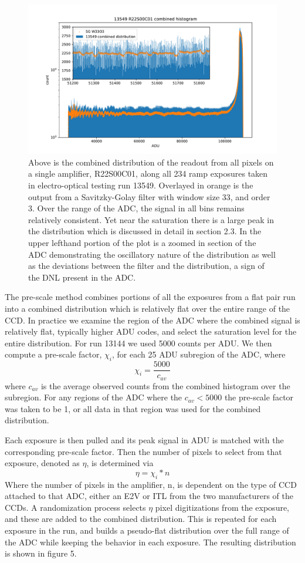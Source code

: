 \documentclass[11pt, letterpaper]{article}
\begin{document}
\begin{figure}
    \centering
    \includegraphics[width=0.5\linewidth]{bar13549.pdf}
    \caption{Above is the combined distribution of the readout from all pixels on a single amplifier, R22S00C01, along all 234 ramp exposures taken in electro-optical testing run 13549. Overlayed in orange is the output from a Savitzky-Golay filter with window size 33, and order 3. Over the range of the ADC, the signal in all bins remains relatively consistent. Yet near the saturation there is a large peak in the distribution which is discussed in detail in section 2.3. In the upper lefthand portion of the plot is a zoomed in section of the ADC demonstrating the oscillatory nature of the distribution as well as the deviations between the filter and the distribution, a sign of the DNL present in the ADC.}
\end{figure}


The pre-scale method combines portions of all the exposures from a flat pair run into a combined distribution which is relatively flat over the entire range of the CCD. 
In practice we examine the region of the ADC where the combined signal is relatively flat, typically higher ADU codes, and select the saturation level for the entire distribution. 
For run 13144 we used 5000 counts per ADU. 
 We then compute a pre-scale factor, $\chi _i$, for each 25 ADU subregion of the ADC, where
\begin{equation}
\chi_i = \frac{5000}{c_{av}}
\end{equation}
where $c_{av}$ is the average observed counts from the combined histogram over the subregion. 
For any regions of the ADC where the $c_{av} < 5000$ the pre-scale factor was taken to be 1, or all data in that region was used for the combined distribution. 
\indent 


Each exposure is then pulled and its peak signal in ADU is matched with the corresponding pre-scale factor. 
Then the number of pixels to select from that exposure, denoted as $\eta $, is determined via
 \begin{equation}
 \eta = \chi_i *n 
\end{equation}
Where the number of pixels in the amplifier, n, is dependent on the type of CCD attached to that ADC, either an E2V or ITL from the two manufacturers of the CCDs. 
A randomization process selects $\eta$ pixel digitizations from the exposure, and these are added to the combined distribution. 
This is repeated for each exposure in the run, and builds a pseudo-flat distribution over the full range of the ADC while keeping the behavior in each exposure. 
The resulting distribution is shown in figure 5. 
\end{document}
